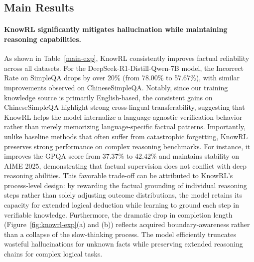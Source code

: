 

\subsection{Main Results}
\paragraph{KnowRL significantly mitigates hallucination while maintaining reasoning capabilities.}
As shown in Table~\ref{main-exp}, KnowRL consistently improves factual reliability across all datasets. 
For the DeepSeek-R1-Distill-Qwen-7B model, the Incorrect Rate on SimpleQA drops by over 20\% (from 78.00\% to 57.67\%), with similar improvements observed on ChineseSimpleQA. 
Notably, since our training knowledge source is primarily English-based, the consistent gains on ChineseSimpleQA highlight strong cross-lingual transferability, suggesting that KnowRL helps the model internalize a language-agnostic verification behavior rather than merely memorizing language-specific factual patterns.
Importantly, unlike baseline methods that often suffer from catastrophic forgetting, KnowRL preserves strong performance on complex reasoning benchmarks. 
For instance, it improves the GPQA score from 37.37\% to 42.42\% and maintains stability on AIME 2025, demonstrating that factual supervision does not conflict with deep reasoning abilities.
This favorable trade-off can be attributed to KnowRL's process-level design: by rewarding the factual grounding of individual reasoning steps rather than solely adjusting outcome distributions, the model retains its capacity for extended logical deduction while learning to ground each step in verifiable knowledge.
Furthermore, the dramatic drop in completion length (Figure~\ref{fig:knowrl-exp}(a) and (b)) reflects acquired boundary-awareness rather than a collapse of the slow-thinking process.
The model efficiently truncates wasteful hallucinations for unknown facts while preserving extended reasoning chains for complex logical tasks.




